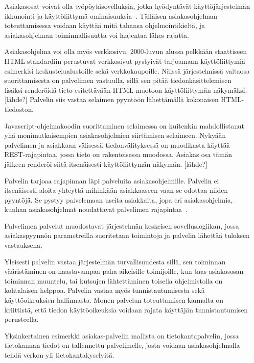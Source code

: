 \documentclass[12pt]{article}
\begin{document}
Asiakasosat voivat olla työpöytäsovelluksia, jotka hyödyntävät käyttöjärjestelmän
ikkunointi ja käyttöliittymä ominaisuuksia~\cite{sinha_client-server_1992}.
Tälläisen asiakasohjelman toteuttamisessa voidaan käyttää mitä tahansa ohjelmointikieltä,
ja asiakasohjelman toiminnallisuutta voi laajentaa lähes rajatta.

Asiakasohjelma voi olla myös verkkosivu. 2000-luvun alussa
pelkkään staattiseen HTML-standardiin perustuvat verkkosivut pystyivät
tarjoamaan käyttöliittymiä esimerkisi keskustelualustoille sekä verkkokaupoille.
Näissä järjestelmissä valtaosa suorittamisesta on palvelimen vastuulla,
sillä sen pitää tiedonkäsittelemisen lisäksi renderöidä tieto
esitettävään HTML-muotoon käyttöliittymän näkymäksi.[lähde?] Palvelin
siis vastaa selaimen pyyntöön lähettämällä kokonaisen HTML-tiedoston.

Javascript-ohjelmakoodin suorittaminen selaimessa on kuitenkin mahdollistanut
yhä monimutkaisempien asiakasohjelmien siirtämisen selaimeen.
Nykyään palvelimen ja asiakkaan
välisessä tiedonvälityksessä on muodikasta käyttää REST-rajapintaa, jossa
tieto on rakenteisessa muodossa. Asiakas osa tämän jälkeen renderöi siitä
itsenäisesti käyttöliittymän näkymän. [lähde?]

Palvelin tarjoaa rajapinnan läpi palveluita asiakasohjelmille.
Palvelin ei itsenäisesti aloita yhteyttä mihinkään
asiakkaaseen vaan se odottaa niiden pyyntöjä.
Se pystyy palvelemaan useita asiakkaita, jopa
eri asiakasohjelmia, kunhan asiakasohjelmat noudattavat
palvelimen rajapintaa~\cite{sinha_client-server_1992}.

Palvelimen palvelut muodostavat järjestelmän keskeisen
sovelluslogiikan, jossa asiakaspyynnön parametreilla
suoritetaan toimintoja ja palvelin lähettää
tuloksen vastauksena.

Yleisesti palvelin vastaa järjestelmän turvallisuudesta sillä,
sen toiminnan vääristäminen on haastavampaa paha-aikeisille
toimijoille, kun taas asiakasosan toiminnan muuntelu, tai kutsujen
lähtettäminen toisella ohjelmistolla on kohtalaisen helppoa.
Palvelin vastaa myös tunnistautumisesta sekä käyttöoikeuksien hallinnasta.
Monen palvelun toteuttamisen kannalta on kriittistä, että
tiedon käyttöoikeuksia voidaan rajata käyttäjän tunnistautumisen perusteella.

Yksinkertainen esimerkki asiakas-palvelin mallista on tietokantapalvelin,
jossa tietokannan tiedot on tallennettu palvelimelle, josta voidaan
asiakasohjelmalla tehdä verkon yli tietokantakyselyitä.
\end{document}
